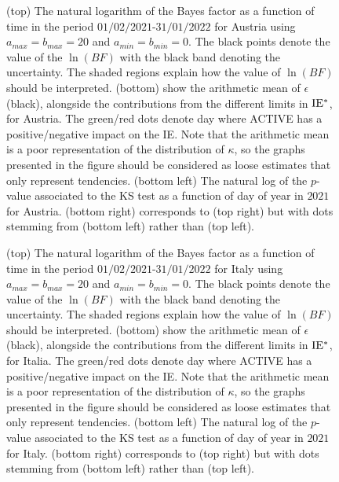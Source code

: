 \documentclass[fleqn,usenatbib,nofootinbib]{revtex4-2}
\begin{document}
\begin{appendices}
		\begin{figure}[H]
			\caption{\label{fig:a6} (top) The natural logarithm of the Bayes factor as a function of time in the period $01/02/2021$-$31/01/2022$ for Austria using $a_{max}=b_{max}=20$ and $a_{min}=b_{min}=0$. The black points denote the value of the $\ln(BF)$ with the black band denoting the uncertainty. The shaded regions explain how the value of $\ln(BF)$ should be interpreted. (bottom) show the arithmetic mean of $\epsilon$ (black), alongside the contributions from the different limits in $\rm IE^*$, for Austria. The green/red dots denote day where ACTIVE has a positive/negative impact on the IE. Note that the arithmetic mean is a poor representation of the distribution of $\kappa$, so the graphs presented in the figure should be considered as loose estimates that only represent tendencies. (bottom left) The natural log of the $p$-value associated to the KS test as a function of day of year in $2021$ for Austria. (bottom right) corresponds to (top right) but with dots stemming from (bottom left) rather than (top left).}
		\end{figure}
		
		\begin{figure}[H]
			\caption{\label{fig:a7} (top) The natural logarithm of the Bayes factor as a function of time in the period $01/02/2021$-$31/01/2022$ for Italy using $a_{max}=b_{max}=20$ and $a_{min}=b_{min}=0$. The black points denote the value of the $\ln(BF)$ with the black band denoting the uncertainty. The shaded regions explain how the value of $\ln(BF)$ should be interpreted. (bottom) show the arithmetic mean of $\epsilon$ (black), alongside the contributions from the different limits in $\rm IE^*$, for Italia. The green/red dots denote day where ACTIVE has a positive/negative impact on the IE. Note that the arithmetic mean is a poor representation of the distribution of $\kappa$, so the graphs presented in the figure should be considered as loose estimates that only represent tendencies. (bottom left) The natural log of the $p$-value associated to the KS test as a function of day of year in $2021$ for Italy. (bottom right) corresponds to (top right) but with dots stemming from (bottom left) rather than (top left).}
		\end{figure}
		

\end{appendices}
\end{document}
